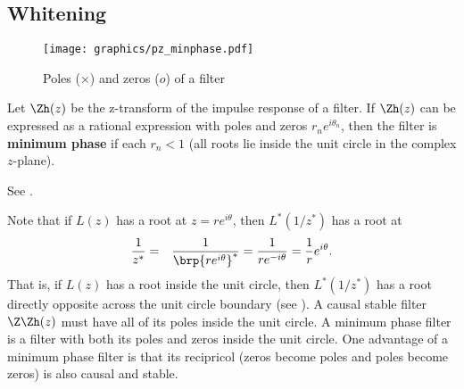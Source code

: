 \subsection{Whitening}
\label{sec:d-whiten}
\begin{figure}[h]
  \centering
  \texttt{[image: graphics/pz\_minphase.pdf]}
  \caption{
     Poles ($\times$) and zeros ($o$) of a  filter
     \label{fig:w_pz_minphase}
     }
\end{figure}
\begin{definition}
Let $\Zh(z)$ be the z-transform of the impulse response of a filter.
If $\Zh(z)$ can be expressed as a rational expression with poles and zeros
$r_ne^{i\theta_n}$,
then the filter is \textbf{minimum phase} if each $r_n<1$
(all roots lie inside the unit circle in the complex $z$-plane).
\end{definition}
See .

Note that if $L(z)$ has a root at $z=re^{i\theta}$, then
$L^\ast(1/z^\ast)$ has a root at
\begin{eqnarray*}
   \frac{1}{z^\ast}
     &=& \frac{1}{\brp{re^{i\theta}}^\ast}
      = \frac{1}{re^{-i\theta}}
      = \frac{1}{r} e^{i\theta}.
\end{eqnarray*}
That is, if $L(z)$ has a root inside the unit circle,
then $L^\ast(1/z^\ast)$ has a root directly opposite across the unit circle
boundary (see ).
A causal stable filter $\Z\Zh(z)$ must have all of its poles inside
the unit circle.
A minimum phase filter is a filter with both its poles and zeros inside the
unit circle.
One advantage of a minimum phase filter is that its recipricol
(zeros become poles and poles become zeros)
is also causal and stable.

